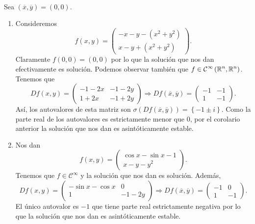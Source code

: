 \begin{eg}[Problema 27]
Sea $\displaystyle \left(\overline{x}, \overline{y}\right)=\left(0,0\right) $. 
\begin{enumerate}
\item Consideremos 
	\[f\left(x,y\right)=\begin{pmatrix} -x-y-\left(x^{2}+y^{2}\right) \\ x-y+\left(x^{2}+y^{2}\right) \end{pmatrix} .\]
	Claramente $\displaystyle f\left(0,0\right)=\left(0,0\right) $ por lo que la solución que nos dan efectivamente es solución. Podemos observar también que $\displaystyle f \in \mathcal{C}^{\infty } \left(\mathbb{R}^{n}, \mathbb{R}^{n}\right)$. Tenemos que 
	\[Df\left(x,y\right)=\begin{pmatrix} -1-2x & -1-2y \\ 1 + 2x & -1 + 2y \end{pmatrix} \Rightarrow Df\left(\overline{x}, \overline{y}\right)=\begin{pmatrix} -1 & -1 \\ 1 & - 1 \end{pmatrix} .\]
	Así, los autovalores de esta matriz son $\displaystyle \sigma\left(Df\left(\overline{x}, \overline{y}\right)\right)= \left\{ -1 \pm i\right\}  $. Como la parte real de los autovalores es estrictamente menor que 0, por el corolario anterior la solución que nos dan es asintóticamente estable. 
\item Nos dan 
	\[f\left(x,y\right)=\begin{pmatrix} \cos x - \sin x - 1 \\ x - y - y^{2} \end{pmatrix} .\]
	Tenemos que $\displaystyle f \in \mathcal{C}^{\infty } $ y la solución que nos dan es solución. Además, 
	\[Df\left(x,y\right)=\begin{pmatrix} -\sin x - \cos x & 0 \\ 1 & - 1 - 2y \end{pmatrix}\Rightarrow Df\left(\overline{x}, \overline{y}\right)=\begin{pmatrix} -1 & 0 \\ 1 & - 1 \end{pmatrix} .\]
El único autovalor es $\displaystyle -1 $ que tiene parte real estrictamente negativa por lo que la solución que nos dan es asintóticamente estable.	
\end{enumerate}
\end{eg}
